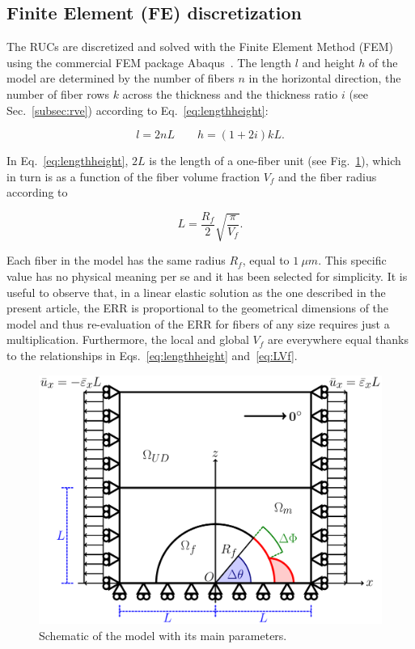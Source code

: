 \documentclass[review]{elsarticle}
\begin{document}

\subsection{Finite Element (FE) discretization}

The RUCs are discretized and solved with the Finite Element Method (FEM) using the commercial FEM package Abaqus~\cite{abq12}. The length $l$ and height $h$ of the model are determined by the number of fibers $n$ in the horizontal direction, the number of fiber rows $k$ across the thickness and the thickness ratio $i$ (see Sec.~\ref{subsec:rve}) according to Eq.~\ref{eq:lengthheight}:

\begin{equation}\label{eq:lengthheight}
l=2nL\qquad h=\left(1+2i\right)kL.
\end{equation}

In Eq.~\ref{eq:lengthheight}, $2L$ is the length of a one-fiber unit (see Fig.~\ref{fig:modelschem}), which in turn is as a function of the fiber volume fraction $V_{f}$ and the fiber radius according to

\begin{equation}\label{eq:LVf}
L=\frac{R_{f}}{2}\sqrt{\frac{\pi}{V_{f}}}.
\end{equation}

Each fiber in the model has the same radius $R_{f}$, equal to $1\ \mu m$. This specific value has no physical meaning per se and it has been selected for simplicity. It is useful to observe that, in a linear elastic solution as the one described in the present article, the ERR is proportional to the geometrical dimensions of the model and thus re-evaluation of the ERR for fibers of any size requires just a multiplication. Furthermore, the local and global $V_{f}$ are everywhere equal thanks to the relationships in Eqs.~\ref{eq:lengthheight} and~\ref{eq:LVf}.

\begin{figure}[!h]
\centering
        \includegraphics[width=\textwidth]{RUC.pdf}
\caption{Schematic of the model with its main parameters.}\label{fig:modelschem}
\end{figure}
\end{document}
